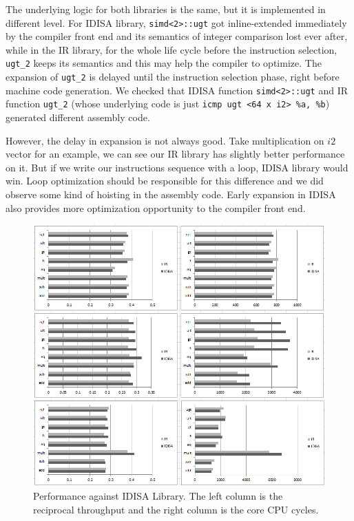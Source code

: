 The underlying logic for both libraries is the same, but it is implemented in different level. For IDISA library, {\tt simd<2>::ugt} got inline-extended immediately by the compiler front end and its semantics of integer comparison lost ever after, while in the IR library, for the whole life cycle before the instruction selection, {\tt ugt\_2} keeps its semantics and this may help the compiler to optimize. The expansion of {\tt ugt\_2} is delayed until the instruction selection phase, right before machine code generation. We checked that IDISA function {\tt simd<2>::ugt} and IR function {\tt ugt\_2} (whose underlying code is just \verb|icmp ugt <64 x i2> %a, %b|) generated different assembly code.

However, the delay in expansion is not always good. Take multiplication on $i2$ vector for an example, we can see our IR library has slightly better performance on it. But if we write our instructions sequence with a loop, IDISA library would win. Loop optimization should be responsible for this difference and we did observe some kind of hoisting in the assembly code. Early expansion in IDISA also provides more optimization opportunity to the compiler front end.

\begin{figure}[ht!]
\centering
\includegraphics[width=140mm]{draw/vector_idisa_perf.png}
\caption[Performance Against IDISA Library]{Performance against IDISA Library. The left column is the reciprocal throughput and the right column is the core CPU cycles.}
\label{figure:vector_perf_idisa}
\end{figure}

